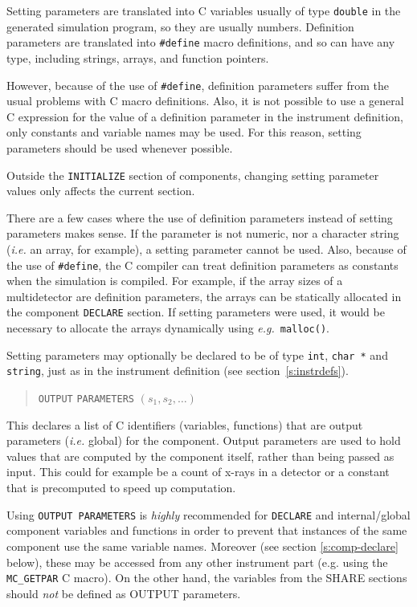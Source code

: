 Setting parameters are translated into C variables usually of type
\verb+double+ in the generated simulation program, so they are usually
numbers. Definition parameters are translated into \verb+#define+ macro
definitions, and so can have any type, including strings, arrays, and
function pointers.

However, because of the use of \verb+#define+, definition parameters
suffer from the usual problems with C macro definitions. Also, it is not
possible to use a general C expression for the value of a definition
parameter in the instrument definition, only constants and variable
names may be used. For this reason, setting parameters should be used
whenever possible.

Outside the \verb+INITIALIZE+ section of components, changing setting parameter values only affects the current section.

There are a few cases where the use of definition parameters instead of
setting parameters makes sense. If the parameter is not numeric, nor a character string ({\em i.e.} an
array, for example), a setting parameter cannot be
used. Also, because of the use of \verb+#define+, the C compiler can
treat definition parameters as constants when the simulation is
compiled. For example, if the array sizes of a multidetector are
definition parameters, the arrays can be statically allocated in the
component \verb+DECLARE+ section. If setting parameters were used, it
would be necessary to allocate the arrays dynamically using {\em e.g.}\
\verb+malloc()+.

Setting parameters may optionally be declared to be of type
\verb+int+, \verb+char *+ and \verb+string+, just as in the instrument definition (see section~\ref{s:instrdefs}).

\begin{quote}
  \texttt{OUTPUT} \texttt{PARAMETERS} $(s_1, s_2, \ldots)$
\end{quote}
This declares a list of C identifiers (variables, functions) that are
output parameters (\textit{i.e.} global) for the
component. Output parameters are used to hold values that are computed
by the component itself, rather than being passed as input. This could
for example be a count of x-rays in a detector or a constant that is
precomputed to speed up computation.

Using \texttt{OUTPUT PARAMETERS} is \emph{highly} recommended for
\texttt{DECLARE} and internal/global component variables and functions
in order to prevent that instances of the same component use the same variable names. Moreover (see section \ref{s:comp-declare} below), these may be accessed from any other instrument part (e.g. using the \verb+MC_GETPAR+ C macro).
On the other hand, the variables from the SHARE sections should \emph{not}
be defined as OUTPUT parameters.

